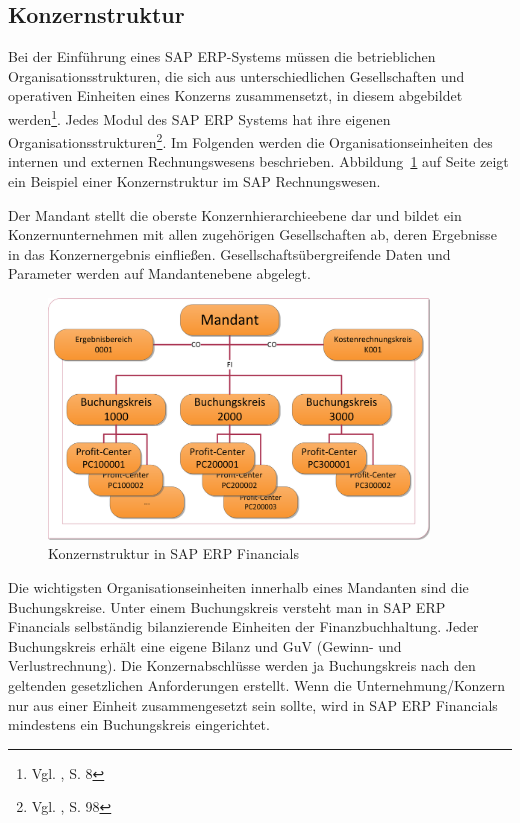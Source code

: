 \subsection{Konzernstruktur}
Bei der Einführung eines SAP ERP-Systems müssen die betrieblichen Organisationsstrukturen, die sich aus unterschiedlichen Gesellschaften und operativen Einheiten eines Konzerns zusammensetzt, in diesem abgebildet werden\footnote{Vgl. \cite{Jacob2008}, S. 8}.
Jedes Modul des SAP ERP Systems hat ihre eigenen Organisationsstrukturen\footnote{Vgl. \cite{Klein2010}, S. 98}. Im Folgenden werden die Organisationseinheiten des internen und externen Rechnungswesens beschrieben. Abbildung~\ref{abb2} auf Seite \pageref{abb2} zeigt ein Beispiel einer Konzernstruktur im SAP Rechnungswesen.

Der Mandant stellt die oberste Konzernhierarchieebene dar und bildet ein Konzernunternehmen mit allen zugehörigen Gesellschaften ab, deren Ergebnisse in das Konzernergebnis einfließen. Gesellschaftsübergreifende Daten und Parameter werden auf Mandantenebene abgelegt.
\begin{figure}[htbp]
\begin{center}
\includegraphics[width=0.9\textwidth]{Images/konzernStruktur.png}

   \caption[Konzernstruktur in SAP ERP Financials]{Konzernstruktur in SAP ERP Financials}\label{abb2}
\end{center}
\end{figure}\noindent
Die wichtigsten Organisationseinheiten innerhalb eines Mandanten sind die Buchungskreise. Unter einem Buchungskreis versteht man in SAP ERP Financials selbständig bilanzierende Einheiten der Finanzbuchhaltung. Jeder Buchungskreis erhält eine eigene Bilanz und GuV (Gewinn- und Verlustrechnung). Die Konzernabschlüsse werden ja Buchungskreis nach den geltenden gesetzlichen Anforderungen erstellt. Wenn die Unternehmung/Konzern nur aus einer Einheit zusammengesetzt sein sollte, wird in SAP ERP Financials mindestens ein Buchungskreis eingerichtet.

